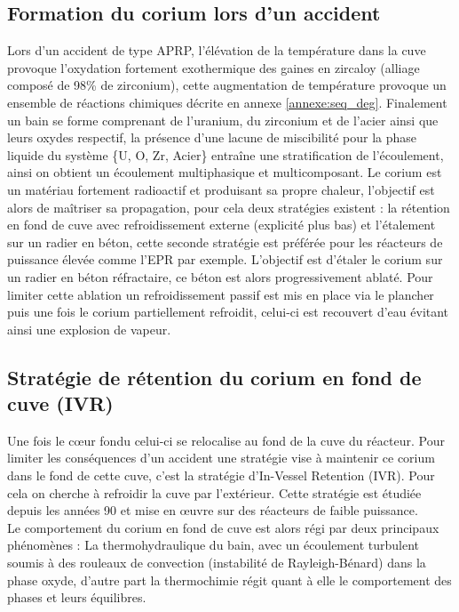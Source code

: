 \subsection{Formation du corium lors d'un accident}
Lors d'un accident de type APRP, l'élévation de la température dans la cuve provoque l'oxydation fortement exothermique des gaines en zircaloy (alliage composé de 98\% de zirconium), cette augmentation de température provoque un ensemble de réactions chimiques décrite en annexe \ref{annexe:seq_deg}. Finalement un bain se forme comprenant de l'uranium, du zirconium et de l'acier ainsi que leurs oxydes respectif, la présence d'une lacune de miscibilité pour la phase liquide du système \{U, O, Zr, Acier\} entraîne une stratification de l'écoulement, ainsi on obtient un écoulement multiphasique et multicomposant. Le corium est un matériau fortement radioactif et produisant sa propre chaleur, l'objectif est alors de maîtriser sa propagation, pour cela deux stratégies existent : la rétention en fond de cuve avec refroidissement externe (explicité plus bas) et l'étalement sur un radier en béton, cette seconde stratégie est préférée pour les réacteurs de puissance élevée comme l'EPR par exemple. L'objectif est d'étaler le corium sur un radier en béton réfractaire, ce béton est alors progressivement ablaté. Pour limiter cette ablation un refroidissement passif est mis en place via le plancher puis une fois le corium partiellement refroidit, celui-ci est recouvert d'eau évitant ainsi une explosion de vapeur.
\subsection{Stratégie de rétention du corium en fond de cuve (IVR)}
Une fois le c\oe ur fondu celui-ci se relocalise au fond de la cuve du réacteur. Pour limiter les conséquences d'un accident une stratégie vise à maintenir ce corium dans le fond de cette cuve, c'est la stratégie d'In-Vessel Retention (IVR). Pour cela on cherche à refroidir la cuve par l'extérieur. Cette stratégie est étudiée depuis les années 90 et mise en \oe uvre sur des réacteurs de faible puissance. \\
Le comportement du corium en fond de cuve est alors régi par deux principaux phénomènes :
La thermohydraulique du bain, avec un écoulement turbulent soumis à des rouleaux de convection (instabilité de Rayleigh-Bénard) dans la phase oxyde, d'autre part la thermochimie régit quant à elle le comportement des phases et leurs équilibres. \\
